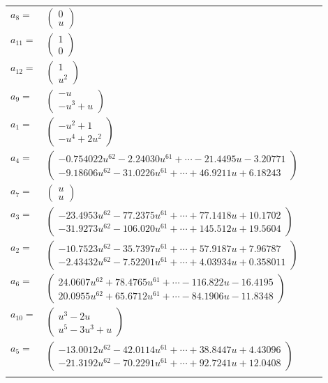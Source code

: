 \documentclass[1p]{elsarticle_modified}
\theoremstyle{definition}
\begin{document}
\begin{tabular}{m{7pt} m{180pt} m{7pt} m{180pt} }
\flushright $a_{8}=$&$\begin{pmatrix}0\\u\end{pmatrix}$ \\
\flushright $a_{11}=$&$\begin{pmatrix}1\\0\end{pmatrix}$ \\
\flushright $a_{12}=$&$\begin{pmatrix}1\\u^2\end{pmatrix}$ \\
\flushright $a_{9}=$&$\begin{pmatrix}- u\\- u^3+u\end{pmatrix}$ \\
\flushright $a_{1}=$&$\begin{pmatrix}- u^2+1\\- u^4+2 u^2\end{pmatrix}$ \\
\flushright $a_{4}=$&$\begin{pmatrix}-0.754022 u^{62}-2.24030 u^{61}+\cdots-21.4495 u-3.20771\\-9.18606 u^{62}-31.0226 u^{61}+\cdots+46.9211 u+6.18243\end{pmatrix}$ \\
\flushright $a_{7}=$&$\begin{pmatrix}u\\u\end{pmatrix}$ \\
\flushright $a_{3}=$&$\begin{pmatrix}-23.4953 u^{62}-77.2375 u^{61}+\cdots+77.1418 u+10.1702\\-31.9273 u^{62}-106.020 u^{61}+\cdots+145.512 u+19.5604\end{pmatrix}$ \\
\flushright $a_{2}=$&$\begin{pmatrix}-10.7523 u^{62}-35.7397 u^{61}+\cdots+57.9187 u+7.96787\\-2.43432 u^{62}-7.52201 u^{61}+\cdots+4.03934 u+0.358011\end{pmatrix}$ \\
\flushright $a_{6}=$&$\begin{pmatrix}24.0607 u^{62}+78.4765 u^{61}+\cdots-116.822 u-16.4195\\20.0955 u^{62}+65.6712 u^{61}+\cdots-84.1906 u-11.8348\end{pmatrix}$ \\
\flushright $a_{10}=$&$\begin{pmatrix}u^3-2 u\\u^5-3 u^3+u\end{pmatrix}$ \\
\flushright $a_{5}=$&$\begin{pmatrix}-13.0012 u^{62}-42.0114 u^{61}+\cdots+38.8447 u+4.43096\\-21.3192 u^{62}-70.2291 u^{61}+\cdots+92.7241 u+12.0408\end{pmatrix}$\\&\end{tabular}
\end{document}

